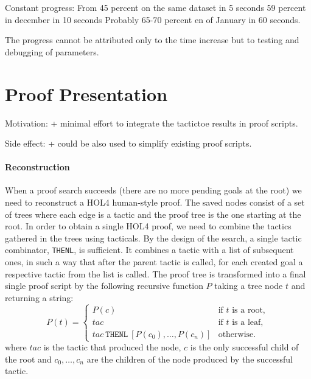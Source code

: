 \documentclass[runningheads,a4paper,draft]{svjour3}
\def\holfour{\textsf{HOL4}\xspace}
\def\tactictoe{\textsf{TacticToe}\xspace}
\newcommand{\ra}[1]{\renewcommand{\arraystretch}{#1}}
\begin{document}

Constant progress: 
  From 45 percent on the same dataset in 5 seconds 
       59 percent in december in 10 seconds
  Probably 65-70 percent en of January in 60 seconds.      

The progress cannot be attributed only to the time increase but to testing and 
debugging of parameters.

\section{Proof Presentation}\label{sec:proofdisplay}

Motivation: 
+ minimal effort to integrate the tactictoe results in proof scripts.

Side effect:
+ could be also used to simplify existing proof scripts. 

\paragraph{Reconstruction}
When a proof search succeeds (there are no more pending goals at the root)
we need to reconstruct a \holfour human-style proof.
The saved nodes consist of a set of trees where each edge is a tactic and
the proof tree is the one starting at the root.
In order to obtain a single \holfour proof, we need to combine the tactics
gathered in the trees using tacticals.
By the design of the search, a single tactic combinator, \texttt{THENL}, is 
sufficient. It combines a tactic with a list of subsequent ones, in such a way 
that after the parent tactic is called, for each created goal a respective 
tactic from the list is called.
The proof tree is transformed into a final single proof script
 by the following recursive function $P$ taking a
tree node $t$ and returning a string:
\begin{equation*}
P(t) =
\begin{cases}
P(c) & \text{if $t$ is a root},\\
tac & \text{if $t$ is a leaf},\\
tac\ \texttt{THENL}\ [P(c_0),\ldots,P(c_n)] & \text{otherwise.}
\end{cases}
\end{equation*}
where $tac$ is the tactic that produced the node, $c$ is the
only successful child of the root and $c_0, \ldots, c_n$ are the 
children of the node produced by the successful tactic.
\end{document}

